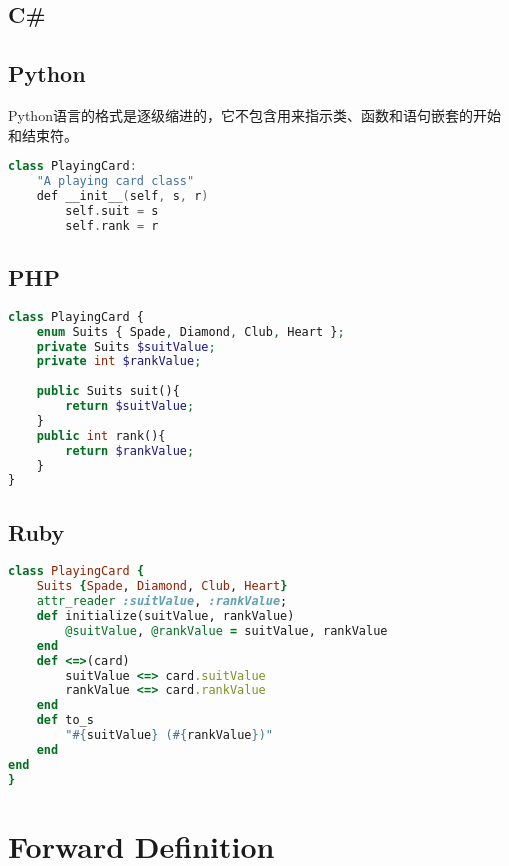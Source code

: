 \subsection{C\#}


\subsection{Python}


Python语言的格式是逐级缩进的，它不包含用来指示类、函数和语句嵌套的开始和结束符。


\begin{lstlisting}[language=C++]
class PlayingCard:
	"A playing card class"
	def __init__(self, s, r)
		self.suit = s
		self.rank = r
\end{lstlisting}


\subsection{PHP}




\begin{lstlisting}[language=PHP]
class PlayingCard {
	enum Suits { Spade, Diamond, Club, Heart };
	private Suits $suitValue;
	private int $rankValue;
	
	public Suits suit(){
		return $suitValue;
	}
	public int rank(){
		return $rankValue;
	}
}
\end{lstlisting}



\subsection{Ruby}



\begin{lstlisting}[language=Ruby]
class PlayingCard {
	Suits {Spade, Diamond, Club, Heart}
	attr_reader :suitValue, :rankValue;
	def initialize(suitValue, rankValue)
		@suitValue, @rankValue = suitValue, rankValue
	end
	def <=>(card)
		suitValue <=> card.suitValue
		rankValue <=> card.rankValue
	end
	def to_s
		"#{suitValue} (#{rankValue})"
	end
end
}
\end{lstlisting}





\section{Forward Definition}

